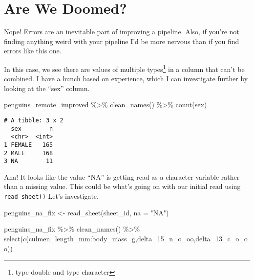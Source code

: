 \documentclass[
  letterpaper,
  DIV=11,
  numbers=noendperiod]{scrreprt}
\newenvironment{Shaded}{\begin{snugshade}}{\end{snugshade}}
\newcommand{\AttributeTok}[1]{\textcolor[rgb]{0.40,0.45,0.13}{#1}}
\newcommand{\FunctionTok}[1]{\textcolor[rgb]{0.28,0.35,0.67}{#1}}
\newcommand{\NormalTok}[1]{\textcolor[rgb]{0.00,0.23,0.31}{#1}}
\newcommand{\OtherTok}[1]{\textcolor[rgb]{0.00,0.23,0.31}{#1}}
\newcommand{\SpecialCharTok}[1]{\textcolor[rgb]{0.37,0.37,0.37}{#1}}
\newcommand{\StringTok}[1]{\textcolor[rgb]{0.13,0.47,0.30}{#1}}
\begin{document}
\hypertarget{are-we-doomed}{%
\section{Are We Doomed?}\label{are-we-doomed}}

Nope! Errors are an inevitable part of improving a pipeline. Also, if
you're not finding anything weird with your pipeline I'd be more nervous
than if you find errors like this one.

In this case, we see there are values of multiple types\footnote{type
  double and type character} in a column that can't be combined. I have
a hunch based on experience, which I can investigate further by looking
at the ``sex'' column.

\begin{Shaded}
\begin{Highlighting}[]
\NormalTok{penguins\_remote\_improved }\SpecialCharTok{\%\textgreater{}\%} 
  \FunctionTok{clean\_names}\NormalTok{() }\SpecialCharTok{\%\textgreater{}\%} 
  \FunctionTok{count}\NormalTok{(sex)}
\end{Highlighting}
\end{Shaded}

\begin{verbatim}
# A tibble: 3 x 2
  sex        n
  <chr>  <int>
1 FEMALE   165
2 MALE     168
3 NA        11
\end{verbatim}

Aha! It looks like the value ``NA'' is getting read as a character
variable rather than a missing value. This could be what's going on with
our initial read using \texttt{read\_sheet()} Let's investigate.

\begin{Shaded}
\begin{Highlighting}[]
\NormalTok{penguins\_na\_fix }\OtherTok{\textless{}{-}} \FunctionTok{read\_sheet}\NormalTok{(sheet\_id, }\AttributeTok{na =} \StringTok{"NA"}\NormalTok{)}

\NormalTok{penguins\_na\_fix }\SpecialCharTok{\%\textgreater{}\%} 
  \FunctionTok{clean\_names}\NormalTok{() }\SpecialCharTok{\%\textgreater{}\%} 
  \FunctionTok{select}\NormalTok{(}\FunctionTok{c}\NormalTok{(culmen\_length\_mm}\SpecialCharTok{:}\NormalTok{body\_mass\_g,delta\_15\_n\_o\_oo,delta\_13\_c\_o\_oo))}
\end{Highlighting}
\end{Shaded}
\end{document}
